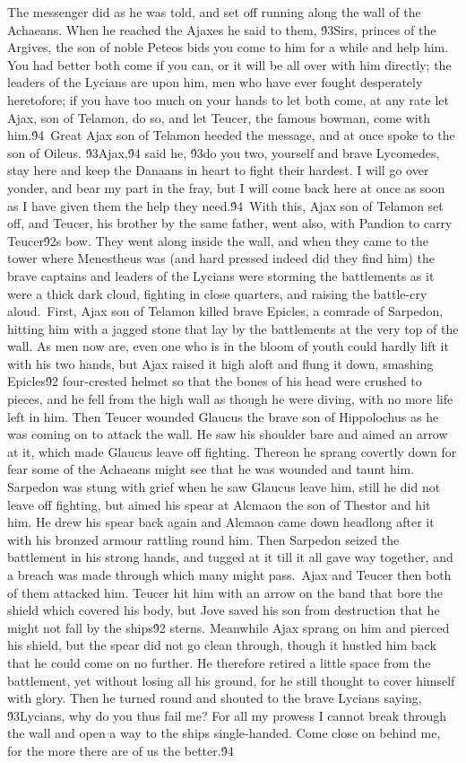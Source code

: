 {The messenger did as he was told, and set off running along the wall of the Achaeans. When he reached the Ajaxes he said to them, \'93Sirs, princes of the Argives, the son of noble Peteos bids you come to him for a while and help him. You had better both come if you can, or it will be all over with him directly; the leaders of the Lycians are upon him, men who have ever fought desperately heretofore; if you have too much on your hands to let both come, at any rate let Ajax, son of Telamon, do so, and let Teucer, the famous bowman, come with him.\'94\
Great Ajax son of Telamon heeded the message, and at once spoke to the son of Oileus. \'93Ajax,\'94 said he, \'93do you two, yourself and brave Lycomedes, stay here and keep the Danaans in heart to fight their hardest. I will go over yonder, and bear my part in the fray, but I will come back here at once as soon as I have given them the help they need.\'94\
With this, Ajax son of Telamon set off, and Teucer, his brother by the same father, went also, with Pandion to carry Teucer\'92s bow. They went along inside the wall, and when they came to the tower where Menestheus was (and hard pressed indeed did they find him) the brave captains and leaders of the Lycians were storming the battlements as it were a thick dark cloud, fighting in close quarters, and raising the battle-cry aloud.\
First, Ajax son of Telamon killed brave Epicles, a comrade of Sarpedon, hitting him with a jagged stone that lay by the battlements at the very top of the wall. As men now are, even one who is in the bloom of youth could hardly lift it with his two hands, but Ajax raised it high aloft and flung it down, smashing Epicles\'92 four-crested helmet so that the bones of his head were crushed to pieces, and he fell from the high wall as though he were diving, with no more life left in him. Then Teucer wounded Glaucus the brave son of Hippolochus as he was coming on to attack the wall. He saw his shoulder bare and aimed an arrow at it, which made Glaucus leave off fighting. Thereon he sprang covertly down for fear some of the Achaeans might see that he was wounded and taunt him. Sarpedon was stung with grief when he saw Glaucus leave him, still he did not leave off fighting, but aimed his spear at Alcmaon the son of Thestor and hit him. He drew his spear back again and Alcmaon came down headlong after it with his bronzed armour rattling round him. Then Sarpedon seized the battlement in his strong hands, and tugged at it till it all gave way together, and a breach was made through which many might pass.\
Ajax and Teucer then both of them attacked him. Teucer hit him with an arrow on the band that bore the shield which covered his body, but Jove saved his son from destruction that he might not fall by the ships\'92 sterns. Meanwhile Ajax sprang on him and pierced his shield, but the spear did not go clean through, though it hustled him back that he could come on no further. He therefore retired a little space from the battlement, yet without losing all his ground, for he still thought to cover himself with glory. Then he turned round and shouted to the brave Lycians saying, \'93Lycians, why do you thus fail me? For all my prowess I cannot break through the wall and open a way to the ships single-handed. Come close on behind me, for the more there are of us the better.\'94\
}
